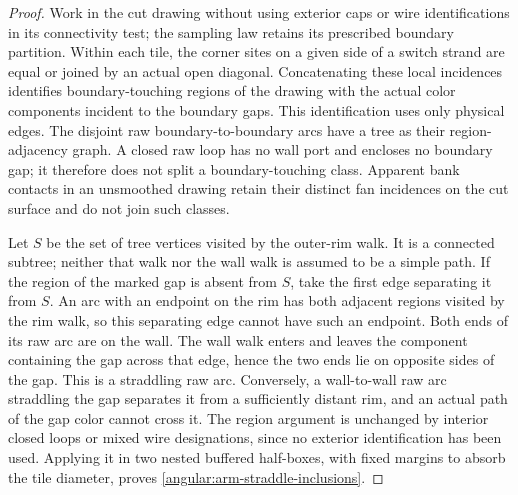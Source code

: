 \begin{proof}
Work in the cut drawing without using exterior caps or wire
identifications in its connectivity test; the sampling law retains
its prescribed boundary partition.  Within each tile, the corner sites
on a given side of a switch strand are equal or joined by an actual
open diagonal.  Concatenating these local incidences identifies
boundary-touching regions of the drawing with the actual color
components incident to the boundary gaps.  This identification uses
only physical edges.  The disjoint raw boundary-to-boundary arcs
have a tree as their region-adjacency graph.  A closed raw loop has
no wall port and encloses no boundary gap; it therefore does not
split a boundary-touching class.  Apparent bank contacts in an
unsmoothed drawing retain their distinct fan incidences on the cut
surface and do not join such classes.

Let $S$ be the set of tree vertices visited by the outer-rim walk.
It is a connected subtree; neither that walk nor the wall walk is
assumed to be a simple path.  If the region of the marked gap is
absent from $S$, take the first edge separating it from $S$.
An arc with an endpoint on the rim has both adjacent regions
visited by the rim walk, so this separating edge cannot have such
an endpoint.  Both ends of its raw arc are on the wall.  The wall
walk enters and leaves the component containing the gap across
that edge, hence the two ends lie on opposite sides of the gap.
This is a straddling raw arc.  Conversely, a wall-to-wall raw arc
straddling the gap separates it from a sufficiently distant rim,
and an actual path of the gap color cannot cross it.  The region
argument is unchanged by interior closed loops or mixed wire
designations, since no exterior identification has been used.
Applying it in two nested buffered half-boxes, with fixed margins
to absorb the tile diameter, proves
\eqref{angular:arm-straddle-inclusions}.


\end{proof}
